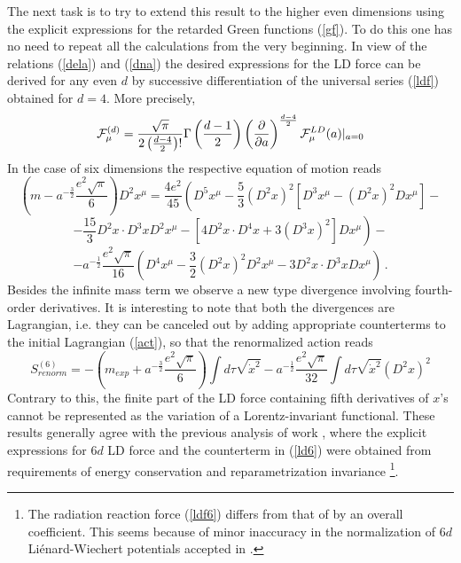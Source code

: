 \documentclass[a4paper,12pt]{article}
\begin{document}
The next task is to try to extend this result to the higher even dimensions
using the explicit expressions for the retarded Green functions (\ref{gf}).
To do this one has no need to repeat all the calculations from the very
beginning. In view of the relations (\ref{dela}) and (\ref{dna})
the desired
expressions for the LD force can be derived for any even $d$
by successive differentiation of the universal series (\ref{ldf})
obtained for $d=4$. More precisely,
\begin{equation}
{\cal {F}}_\mu^{(d)}=\frac{\sqrt{\pi }}{2\left( \frac{d-4}2\right) !}\Gamma
\left( \frac{d-1}2\right) \left( \frac \partial {\partial a}\right) ^{\frac{%
d-4}2}{\cal F}_\mu ^{LD}(a)|_{a=0}
\label{Fd}
\end{equation}
In the case of six dimensions the respective equation of motion reads
\begin{equation*}
\left( m-a^{-\frac 32}\frac{e^2\sqrt{\pi }}6\right) D^2x^\mu =\frac{4e^2}{45}%
\left( D^5x^\mu -\frac 53(D^2x)^2[D^3x^\mu -(D^2x)^2Dx^\mu ]-\right.
\end{equation*}
\begin{equation}
\left. -\frac{15}3D^2x\cdot D^3xD^2x^\mu -[4D^2x\cdot D^4x+3(D^3x)^2]Dx^\mu
\right) -  \label{ldf6}
\end{equation}
\begin{equation*}
-a^{-\frac 12}\frac{e^2\sqrt{\pi }}{16}\left( D^4x^\mu -\frac
32(D^2x)^2D^2x^\mu -3D^2x\cdot D^3xDx^\mu \right) \,.
\end{equation*}
Besides the infinite mass term we observe a new type divergence involving
fourth-order derivatives. It is interesting to note that both the
divergences are Lagrangian, i.e. they can be canceled out by adding
appropriate counterterms to the initial Lagrangian (\ref{act}), so that the
renormalized action reads
\begin{equation}
S_{renorm}^{(6)}=-\left( m_{exp}+a^{-\frac 32}\frac{e^2\sqrt{\pi }}6\right)
\int d\tau \sqrt{\dot x^2}-a^{-\frac 12}\frac{e^2\sqrt{\pi }}{32}\int d\tau
\sqrt{\dot x^2}(D^2x)^2  \label{ld6}
\end{equation}
Contrary to this, the finite part of the LD force containing fifth
derivatives of $x$'s cannot be represented as the variation of a
Lorentz-invariant functional. These results generally agree with the
previous analysis of work \cite{Kos}, where the explicit expressions for $6d$
LD force and the counterterm in (\ref{ld6}) were obtained from requirements
of energy conservation and reparametrization invariance \footnote{%
The radiation reaction force (\ref{ldf6}) differs from that of \cite{Kos} by
an overall coefficient. This seems because of minor inaccuracy in the
normalization of $6d$ Li\'enard-Wiechert potentials accepted in \cite{Kos}.}.
\end{document}
